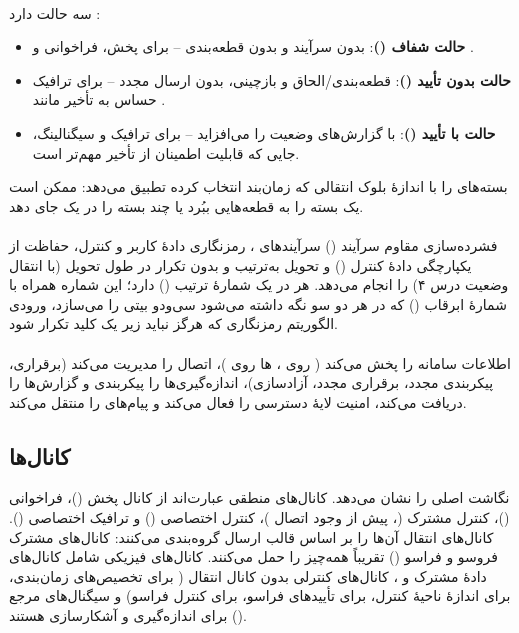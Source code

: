 \documentclass[11pt,a4paper]{article}
\begin{document}
\paragraph{} سه حالت دارد \cite{ts36322}:
\begin{itemize}
  \item \textbf{حالت شفاف ()}: بدون سرآیند و بدون قطعه‌بندی -- برای پخش، فراخوانی و .
  \item \textbf{حالت بدون تأیید ()}: قطعه‌بندی/الحاق و بازچینی، بدون ارسال مجدد -- برای ترافیک
        حساس به تأخیر مانند .
  \item \textbf{حالت با تأیید ()}:  با گزارش‌های وضعیت را می‌افزاید -- برای ترافیک  و
        سیگنالینگ، جایی که قابلیت اطمینان از تأخیر مهم‌تر است.
\end{itemize}
 بسته‌های  را با اندازهٔ بلوک انتقالی که زمان‌بند انتخاب کرده تطبیق می‌دهد: ممکن است یک
بسته را به قطعه‌هایی ببُرد یا چند بسته را در یک  جای دهد.

\paragraph{} \cite{ts36323} فشرده‌سازی مقاوم سرآیند () سرآیندهای ،
رمزنگاری دادهٔ کاربر و کنترل، حفاظت از یکپارچگی دادهٔ کنترل () و تحویل به‌ترتیب و بدون تکرار
در طول تحویل (با انتقال وضعیت  درس ۴) را انجام می‌دهد. هر  در  یک شمارهٔ ترتیب
() دارد؛ این شماره همراه با شمارهٔ ابرقاب () که در هر دو سو نگه داشته می‌شود \emph{}
سی‌ودو بیتی را می‌سازد، ورودی الگوریتم رمزنگاری که هرگز نباید زیر یک کلید تکرار شود.

\paragraph{} \cite{ts36331} اطلاعات سامانه را پخش می‌کند ( روی ، ها روی
)، اتصال  را مدیریت می‌کند (برقراری، پیکربندی مجدد، برقراری مجدد، آزادسازی)،
اندازه‌گیری‌ها را پیکربندی و گزارش‌ها را دریافت می‌کند، امنیت لایهٔ دسترسی را فعال می‌کند و پیام‌های
 را منتقل می‌کند.

\subsection{کانال‌ها}
 نگاشت اصلی را نشان می‌دهد. کانال‌های منطقی عبارت‌اند از کانال پخش ()،
فراخوانی ()، کنترل مشترک (، پیش از وجود اتصال )، کنترل اختصاصی ()
و ترافیک اختصاصی (). کانال‌های انتقال آن‌ها را بر اساس قالب ارسال گروه‌بندی می‌کنند: کانال‌های
مشترک فروسو و فراسو () تقریباً همه‌چیز را حمل می‌کنند. کانال‌های فیزیکی شامل کانال‌های
دادهٔ مشترک  و ، کانال‌های کنترلی بدون کانال انتقال ( برای تخصیص‌های
زمان‌بندی،  برای اندازهٔ ناحیهٔ کنترل،  برای تأییدهای  فراسو، 
برای کنترل فراسو) و سیگنال‌های مرجع () برای اندازه‌گیری و آشکارسازی هستند.
\end{document}

